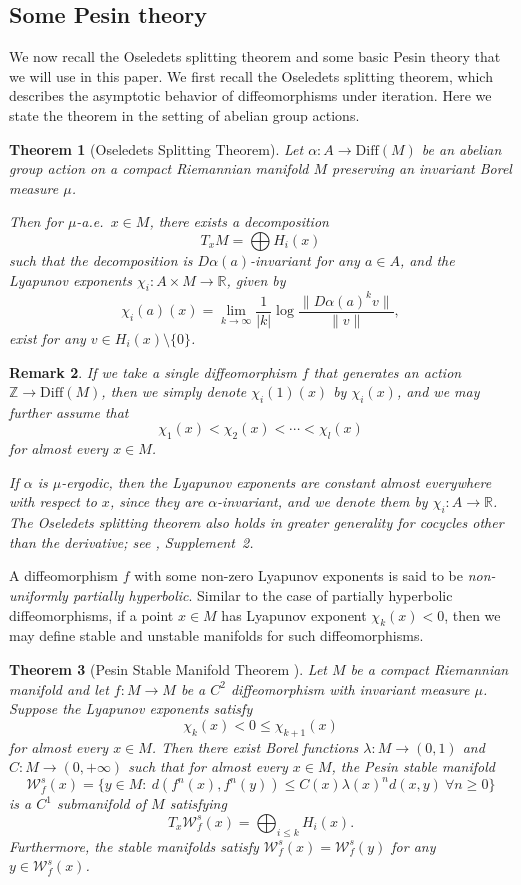 \documentclass[11pt]{amsart}
\numberwithin{equation}{section}
\newcommand{\R}{\mathbb{R}}
\newcommand{\Z}{\mathbb{Z}}
\newcommand{\W}{\mathcal{W}}
\theoremstyle{plain}
\newtheorem{thm}{Theorem}[section]
\newtheorem{rmk}[thm]{Remark}
\begin{document}
\subsection{Some Pesin theory}
We now recall the Oseledets splitting theorem and some basic Pesin theory that we will use in this paper. We first recall the Oseledets splitting theorem, which describes the asymptotic behavior of diffeomorphisms under iteration. Here we state the theorem in the setting of abelian group actions.

\begin{thm}[Oseledets Splitting Theorem]\label{Oseled}
Let $\alpha:A\to \mathrm{Diff}(M)$ be an abelian group action on a compact Riemannian manifold $M$ preserving an invariant Borel measure $\mu$.

Then for $\mu$-a.e.\ $x\in M$, there exists a decomposition
\[
T_xM=\bigoplus H_i(x)
\]
such that the decomposition is $D\alpha(a)$-invariant for any $a\in A$, and the \emph{Lyapunov exponents} $\chi_i:A\times M\to \R$, given by
\[
\chi_i(a)(x)=\lim_{k\to \infty} \frac{1}{|k|}\log\frac{\|D\alpha(a)^k v\|}{\|v\|},
\]
exist for any $v\in H_i(x)\setminus\{0\}$.
\end{thm}

\begin{rmk}
If we take a single diffeomorphism $f$ that generates an action $\Z\to \mathrm{Diff}(M)$, then we simply denote $\chi_i(1)(x)$ by $\chi_i(x)$, and we may further assume that
\[
\chi_1(x)<\chi_2(x)<\cdots<\chi_l(x)
\]
for almost every $x\in M$.

If $\alpha$ is $\mu$-ergodic, then the Lyapunov exponents are constant almost everywhere with respect to $x$, since they are $\alpha$-invariant, and we denote them by $\chi_i:A\to \R$. The Oseledets splitting theorem also holds in greater generality for cocycles other than the derivative; see \cite{introdyn}, Supplement~2.
\end{rmk}

A diffeomorphism $f$ with some non-zero Lyapunov exponents is said to be \emph{non-uniformly partially hyperbolic}. Similar to the case of partially hyperbolic diffeomorphisms, if a point $x\in M$ has Lyapunov exponent $\chi_k(x)<0$, then we may define stable and unstable manifolds for such diffeomorphisms.

\begin{thm}[Pesin Stable Manifold Theorem \cite{Pes}]\label{pesin}
Let $M$ be a compact Riemannian manifold and let $f:M\to M$ be a $C^2$ diffeomorphism with invariant measure $\mu$. Suppose the Lyapunov exponents satisfy
\[
\chi_k(x)<0\le \chi_{k+1}(x)
\]
for almost every $x\in M$. Then there exist Borel functions $\lambda:M\to(0,1)$ and $C:M\to(0,+\infty)$ such that for almost every $x\in M$, the Pesin stable manifold
\[
\W^s_f(x)=\{y\in M:\ d(f^n(x),f^n(y))\le C(x)\lambda(x)^n d(x,y)\ \forall n\ge 0\}
\]
is a $C^1$ submanifold of $M$ satisfying
\[
T_x\W^s_f(x)=\bigoplus_{i\le k} H_i(x).
\]
Furthermore, the stable manifolds satisfy $\W^s_f(x)=\W^s_f(y)$ for any $y\in \W^s_f(x)$.
\end{thm}
\end{document}

